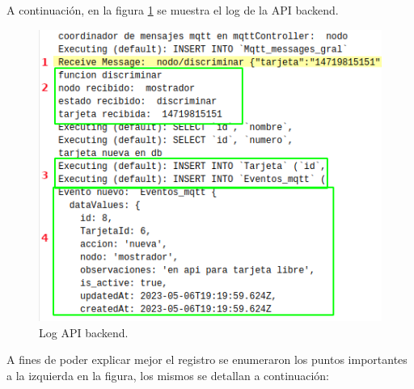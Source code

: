 A continuación, en la figura \ref{fig:ensayo-nueva-logs} se muestra el log de la API backend. 

\begin{figure}[H]
	\centering
	\includegraphics[scale=.95]{./Figures/ensayo-1/6.nueva-logs-1.png}
	\caption{Log API backend.}
	\label{fig:ensayo-nueva-logs}
\end{figure}

A fines de poder explicar mejor el registro se enumeraron los puntos importantes a la izquierda en la figura, los mismos se detallan a continuación:

